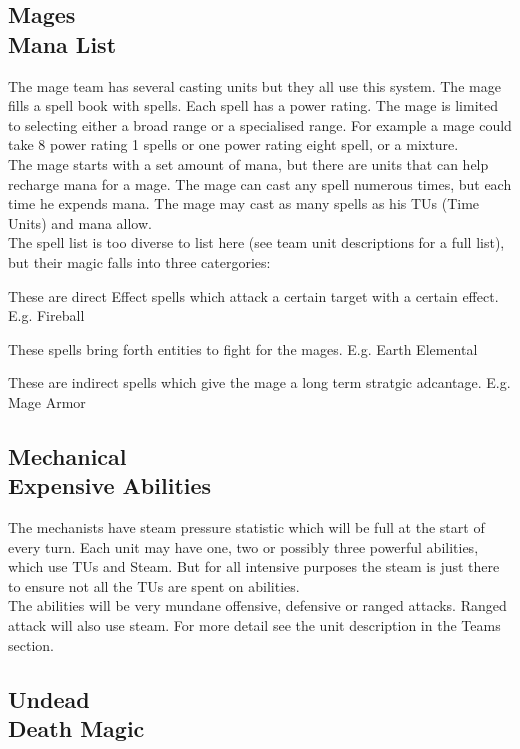 \documentclass[a4paper,twocolumn]{article}
\begin{document}
\subsection{Mages \\ Mana List}

The mage team has several casting units but they all use this system. The mage fills a spell book with spells. Each spell has a power rating. The mage is limited to selecting either a broad range or a specialised range. For example a mage could take 8 power rating 1 spells or one power rating eight spell, or a mixture.\\
The mage starts with a set amount of mana, but there are units that can help recharge mana for a mage. The mage can cast any spell numerous times, but each time he expends mana. The mage may cast as many spells as his TUs (Time Units) and mana allow.\\
The spell list is too diverse to list here (see team unit descriptions for a full list), but their magic falls into three catergories:

These are direct Effect spells which attack a certain target with a certain effect. E.g. Fireball

These spells bring forth entities to fight for the mages. E.g. Earth Elemental

These are indirect spells which give the mage a long term stratgic adcantage. E.g. Mage Armor

\subsection{Mechanical \\ Expensive Abilities}

The mechanists have steam pressure statistic which will be full at the start of every turn. Each unit may have one, two or possibly three powerful abilities, which use TUs and Steam. But for all intensive purposes the steam is just there to ensure not all the TUs are spent on abilities.\\
The abilities will be very mundane offensive, defensive or ranged attacks. Ranged attack will also use steam. For more detail see the unit description in the Teams section.

\subsection{Undead \\ Death Magic}
\end{document}
